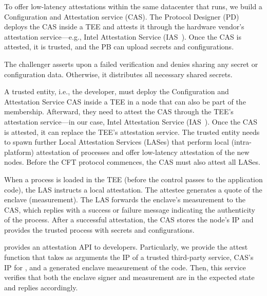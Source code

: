 To offer low-latency attestations within the same datacenter that \projecttitle{} runs, we build a Configuration and Attestation service (CAS). The Protocol Designer (PD) deploys the CAS inside a TEE and attests it through the hardware vendor's attestation service---e.g., Intel Attestation Service (IAS~\cite{ias}). Once the CAS is attested, it is trusted, and the PB can upload secrets and configurations. 

The challenger asserts upon a failed verification and denies sharing any secret or configuration data. Otherwise, it distributes all necessary shared secrets.

A trusted entity, i.e., the developer, must deploy the  Configuration and Attestation Service  CAS inside a TEE in a node that can also be part of the membership. Afterward, they need to attest the CAS through the TEE's attestation service---in our case, Intel Attestation Service (IAS~\cite{ias}). Once the CAS is attested, it can replace the TEE's attestation service. The trusted entity needs to spawn further Local Attestation Services (LASes) that perform local (intra-platform) attestation of processes and offer low-latency attestation of the new nodes. Before the CFT protocol commences, the CAS must also attest all LASes. 

When a \projecttitle{} process is loaded in the TEE (before the control passes to the application code), the LAS instructs a local attestation. The attestee generates a quote of the enclave (measurement). The LAS forwards the enclave's measurement to the CAS, which replies with a success or failure message indicating the authenticity of the process. After a successful attestation, the CAS stores the node's IP and provides the trusted process with secrets and configurations.

\projecttitle{} provides an attestation API to developers. Particularly, we provide the attest function that takes as arguments the IP of a trusted third-party service, CAS's IP for \projecttitle{}, and a generated enclave measurement of the code. Then, this service verifies that both the enclave signer and measurement are in the expected state and replies accordingly.
\fi 

